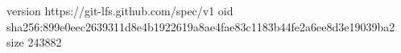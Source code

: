 version https://git-lfs.github.com/spec/v1
oid sha256:899e0eec2639311d8e4b1922619a8ae4fae83c1183b44fe2a6ee8d3e19039ba2
size 243882
